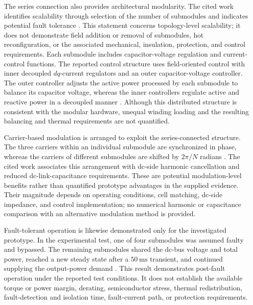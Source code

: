 The series connection also provides architectural modularity. The cited work identifies scalability through selection of the number of submodules and indicates potential fault tolerance \cite{Jin2017}. This statement concerns topology-level scalability; it does not demonstrate field addition or removal of submodules, hot reconfiguration, or the associated mechanical, insulation, protection, and control requirements. Each submodule includes capacitor-voltage regulation and current-control functions. The reported control structure uses field-oriented control with inner decoupled \(dq\)-current regulators and an outer capacitor-voltage controller. The outer controller adjusts the active power processed by each submodule to balance its capacitor voltage, whereas the inner controllers regulate active and reactive power in a decoupled manner \cite{Jin2017}. Although this distributed structure is consistent with the modular hardware, unequal winding loading and the resulting balancing and thermal requirements are not quantified. %

Carrier-based modulation is arranged to exploit the series-connected structure. The three carriers within an individual submodule are synchronized in phase, whereas the carriers of different submodules are shifted by \(2\pi/N\) radians \cite{Jin2017}. The cited work associates this arrangement with dc-side harmonic cancellation and reduced dc-link-capacitance requirements. These are potential modulation-level benefits rather than quantified prototype advantages in the supplied evidence. Their magnitude depends on operating conditions, cell matching, dc-side impedance, and control implementation; no numerical harmonic or capacitance comparison with an alternative modulation method is provided. %

Fault-tolerant operation is likewise demonstrated only for the investigated prototype. In the experimental test, one of four submodules was assumed faulty and bypassed. The remaining submodules shared the dc-bus voltage and total power, reached a new steady state after a \(50~\mathrm{ms}\) transient, and continued supplying the output-power demand \cite{Jin2017}. This result demonstrates post-fault operation under the reported test conditions. It does not establish the available torque or power margin, derating, semiconductor stress, thermal redistribution, fault-detection and isolation time, fault-current path, or protection requirements. %

